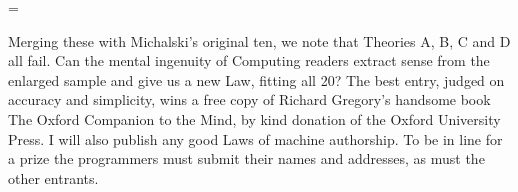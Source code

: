 \centerline{\epsfxsize=\textwidth{}}

Merging these with Michalski's original ten, we note that Theories 
A, B, C and D all fail. Can the mental ingenuity of Computing 
readers extract sense from the enlarged sample and give us a new Law, 
fitting all 20?  The best entry, judged on accuracy and simplicity, wins 
a free copy of Richard Gregory's handsome book The Oxford Companion to 
the Mind, by kind donation of the Oxford University Press. I will also 
publish any good Laws of machine authorship.  To be in line for a prize 
the programmers must submit their names and addresses, as must the other 
entrants. 

